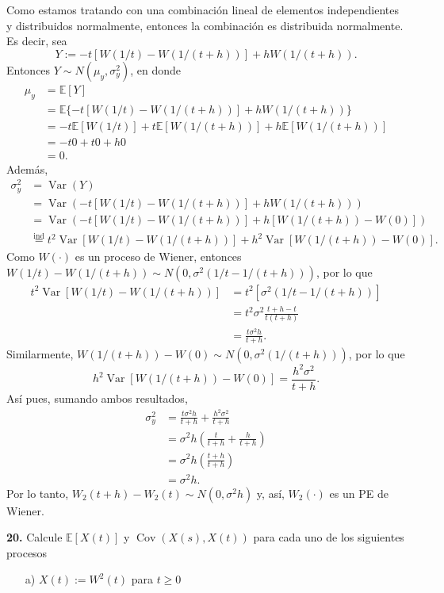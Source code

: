 \documentclass[12pt]{article}
\newcommand{\E}{\mathbb{E}}
\DeclareMathOperator{\Var}{Var}
\DeclareMathOperator{\Cov}{Cov}
\begin{document}
Como estamos tratando con una combinación lineal de elementos independientes y distribuidos normalmente, entonces la combinación es distribuida normalmente. Es decir, sea 
\[Y := -t [ W(1/t) - W(1/(t+h)) ] + hW(1/(t+h)). \]
Entonces $Y \sim N(\mu_y, \sigma_y^2)$, en donde
\begin{align*}
    \mu_y &= \E[Y] \\
    &= \E\{-t [ W(1/t) - W(1/(t+h)) ] + hW(1/(t+h))\} \\
    &= -t \E[W(1/t)] + t\E[W(1/(t+h))] + h\E[W(1/(t+h))] \\
    &= -t0 + t0 + h0 \\
    &= 0.
\end{align*}
Además,
\begin{align*}
    \sigma_y^2 &= \Var(Y) \\
    &= \Var(-t [ W(1/t) - W(1/(t+h)) ] + hW(1/(t+h))) \\
    &= \Var(-t [ W(1/t) - W(1/(t+h)) ] + h[W(1/(t+h))-W(0)]) \\
    &\overset{\mathrm{ind}}{=} t^2\Var[ W(1/t) - W(1/(t+h)) ] + h^2\Var[W(1/(t+h))-W(0)].
\end{align*}
Como $W(\cdot)$ es un proceso de Wiener, entonces $W(1/t) - W(1/(t+h)) \sim N(0, \sigma^2(1/t - 1/(t+h)))$, por lo que
\begin{align*}
    t^2\Var[ W(1/t) - W(1/(t+h)) ] &= t^2[\sigma^2(1/t - 1/(t+h))] \\
    &= t^2\sigma^2 \frac{t+h-t}{t(t+h)}  \\
    &= \frac{t \sigma^2 h}{t+h}.
\end{align*}
Similarmente, $W(1/(t+h))-W(0) \sim N(0, \sigma^2 (1/(t+h)))$, por lo que
\[ h^2\Var[W(1/(t+h))-W(0)] = \frac{h^2 \sigma^2}{t+h}. \]
Así pues, sumando ambos resultados,
\begin{align*}
    \sigma_y^2 &= \frac{t \sigma^2 h}{t+h} + \frac{h^2 \sigma^2}{t+h} \\
    &= \sigma^2h \left(\frac{t}{t+h} + \frac{h}{t+h} \right) \\
    &= \sigma^2h \left(\frac{t+h}{t+h} \right) \\
    &= \sigma^2h.
\end{align*}
Por lo tanto,  $W_2(t+h) - W_2(t) \sim N(0, \sigma^2 h)$ y, así, $W_2(\cdot)$ es un PE de Wiener.

\begin{tcolorbox}[colback=blue!5!white, colframe=blue!5!white, arc=0mm, boxrule=0pt]  
    \textbf{20.} Calcule $\E[X(t)]$ y $\Cov(X(s),X(t))$ para cada uno de los siguientes procesos
    \begin{itemize}
        \item[a)] $X(t):=W^2(t)$ para $t \geq 0$
    \end{itemize}
\end{tcolorbox}
\end{document}
